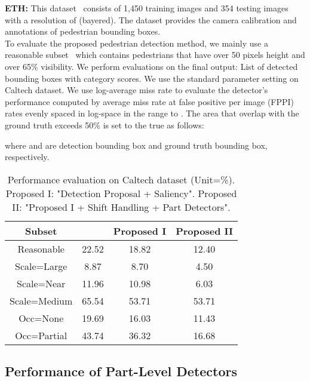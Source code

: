 \documentclass[journal]{IEEEtran}
\begin{document}
\textbf{ETH:} This dataset~\cite{eth_biwi_00534} consists of 1,450 training images and 354 testing images with a resolution of  (bayered). The dataset provides the camera calibration and annotations of pedestrian bounding boxes. \\

To evaluate the proposed pedestrian detection method, we mainly use a reasonable subset~\cite{Dollar2012PAMI, li2018scale} which contains pedestrians that have over 50 pixels height and over 65\% visibility. We perform evaluations on the final output: List of detected bounding boxes with category scores. We use the standard parameter setting on Caltech dataset. We use log-average miss rate to evaluate the detector's performance computed by average miss rate at false positive per image (FPPI) rates evenly spaced in log-space in the range  to . The area that overlap with the ground truth exceeds 50\% is set to the true as follows:



where  and  are detection bounding box and ground truth bounding box, respectively.

\begin{table}[t]
\caption{Performance evaluation on Caltech dataset (Unit=\%). Proposed I: "Detection Proposal + Saliency". Proposed II: "Proposed I + Shift Handling + Part Detectors". }
\begin{center}
\begin{tabular}[c]{|c|c|c|c|}
\hline
\bf{Subset} & \cite{wang2017part} & Proposed I & Proposed II  \\
\hline
Reasonable & 22.52 & 18.82 & 12.40 \\
\hline
Scale=Large & 8.87 & 8.70 & 4.50 \\
\hline
Scale=Near & 11.96 & 10.98 & 6.03 \\
\hline
Scale=Medium & 65.54 & 53.71 & 53.71 \\
\hline
Occ=None & 19.69 & 16.03 & 11.43 \\
\hline
Occ=Partial & 43.74 & 36.32 & 16.68 \\
\hline
\end{tabular}
\end{center}
\label{table:result1}
\end{table}


\subsection{Performance of Part-Level Detectors}
\label{subsec:per-part}
\end{document}
